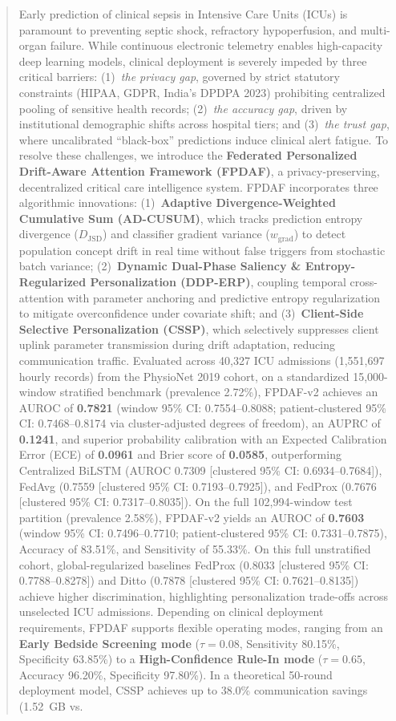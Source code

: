 \documentclass[final,5p,times,twocolumn]{elsarticle}
\begin{document}
\begin{frontmatter}
\begin{abstract}
Early prediction of clinical sepsis in Intensive Care Units (ICUs) is paramount to preventing septic shock, refractory hypoperfusion, and multi-organ failure. While continuous electronic telemetry enables high-capacity deep learning models, clinical deployment is severely impeded by three critical barriers: (1)~\textit{the privacy gap}, governed by strict statutory constraints (HIPAA, GDPR, India's DPDPA 2023) prohibiting centralized pooling of sensitive health records; (2)~\textit{the accuracy gap}, driven by institutional demographic shifts across hospital tiers; and (3)~\textit{the trust gap}, where uncalibrated ``black-box'' predictions induce clinical alert fatigue. To resolve these challenges, we introduce the \textbf{Federated Personalized Drift-Aware Attention Framework (FPDAF)}, a privacy-preserving, decentralized critical care intelligence system. FPDAF incorporates three algorithmic innovations: (1)~\textbf{Adaptive Divergence-Weighted Cumulative Sum (AD-CUSUM)}, which tracks prediction entropy divergence ($D_{\text{JSD}}$) and classifier gradient variance ($w_{\text{grad}}$) to detect population concept drift in real time without false triggers from stochastic batch variance; (2)~\textbf{Dynamic Dual-Phase Saliency \& Entropy-Regularized Personalization (DDP-ERP)}, coupling temporal cross-attention with parameter anchoring and predictive entropy regularization to mitigate overconfidence under covariate shift; and (3)~\textbf{Client-Side Selective Personalization (CSSP)}, which selectively suppresses client uplink parameter transmission during drift adaptation, reducing communication traffic. Evaluated across 40,327 ICU admissions (1,551,697 hourly records) from the PhysioNet 2019 cohort, on a standardized 15,000-window stratified benchmark (prevalence 2.72\%), FPDAF-v2 achieves an AUROC of \textbf{0.7821} (window 95\% CI: 0.7554--0.8088; patient-clustered 95\% CI: 0.7468--0.8174 via cluster-adjusted degrees of freedom), an AUPRC of \textbf{0.1241}, and superior probability calibration with an Expected Calibration Error (ECE) of \textbf{0.0961} and Brier score of \textbf{0.0585}, outperforming Centralized BiLSTM (AUROC 0.7309 [clustered 95\% CI: 0.6934--0.7684]), FedAvg (0.7559 [clustered 95\% CI: 0.7193--0.7925]), and FedProx (0.7676 [clustered 95\% CI: 0.7317--0.8035]). On the full 102,994-window test partition (prevalence 2.58\%), FPDAF-v2 yields an AUROC of \textbf{0.7603} (window 95\% CI: 0.7496--0.7710; patient-clustered 95\% CI: 0.7331--0.7875), Accuracy of 83.51\%, and Sensitivity of 55.33\%. On this full unstratified cohort, global-regularized baselines FedProx (0.8033 [clustered 95\% CI: 0.7788--0.8278]) and Ditto (0.7878 [clustered 95\% CI: 0.7621--0.8135]) achieve higher discrimination, highlighting personalization trade-offs across unselected ICU admissions. Depending on clinical deployment requirements, FPDAF supports flexible operating modes, ranging from an \textbf{Early Bedside Screening mode} ($\tau=0.08$, Sensitivity 80.15\%, Specificity 63.85\%) to a \textbf{High-Confidence Rule-In mode} ($\tau=0.65$, Accuracy 96.20\%, Specificity 97.80\%). In a theoretical 50-round deployment model, CSSP achieves up to 38.0\% communication savings (1.52~GB vs. 
\end{abstract}
\end{frontmatter}
\end{document}
